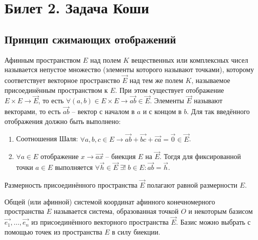\section{Билет 2. Задача Коши}
\subsection{Принцип сжимающих отображений}

\begin{definition}
	Афинным пространством $E$ над полем $K$ вещественных или комплексных чисел называется непустое множество (элементы которого называют точками), которому соответствует векторное пространство $\overrightarrow{E}$ над тем же полем $K$, называемое присоединённым пространством к $E$. При этом существует отображение $E \times E \longrightarrow \overrightarrow{E}$, то есть $\forall (a, b) \in E \times E \longrightarrow \overrightarrow{ab} \in \overrightarrow{E}$. Элементы $\overrightarrow{E}$ называют векторами, то есть $\overrightarrow{ab}$ -- вектор с началом в $a$ и с концом в $b$. Для так введённого отображения должно быть выполнено:
	\begin{enumerate}
		\item Соотношения Шаля: $\forall a, b, c \in E \rightarrow \overrightarrow{ab} + \overrightarrow{bc} + \overrightarrow{ca} = \overrightarrow{0} \in \overrightarrow{E}$.
  		\item $\forall a \in E $ отображение $x \rightarrow \overrightarrow{ax}$ -- биекция $E$ на $\overrightarrow{E}$. Тогдя для фиксированной точки $a \in E$ выполняется $\forall \overrightarrow{h} \in \overrightarrow{E} \; \exists! \; b \in E: \overrightarrow{ab} = \overrightarrow{h}$.
	\end{enumerate}
	
	Размерность присоединённого пространства $\overrightarrow{E}$ полагают равной размерности $E$.
\end{definition}

\begin{definition}
	Общей (или афинной) системой координат афинного конечномерного пространства $E$ называется система, образованная точкой $O$ и некоторым базисом $\overrightarrow{e_1}, \dots, \overrightarrow{e_n}$ из присоединённого векторного пространства $\overrightarrow{E}$. Базис можно выбрать с помощью точек из пространства $E$ в силу биекции.
\end{definition}

